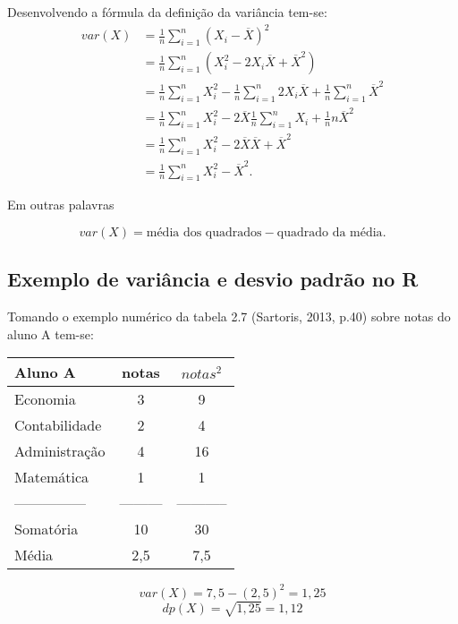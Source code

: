 \documentclass[
]{book}
\begin{document}
Desenvolvendo a fórmula da definição da variância tem-se:
\begin{align*}
  var(X)  &= \frac{1}{n}\sum_{i=1}^{n}(X_i - \overline{X})^2 \\
          &= \frac{1}{n}\sum_{i=1}^{n}(X_i^2 - 2X_i\overline{X} +
          \overline{X}^2)\\
          &= \frac{1}{n}\sum_{i=1}^{n}X_i^2 - 
          \frac{1}{n}\sum_{i=1}^{n}2X_i\overline{X}+
          \frac{1}{n}\sum_{i=1}^{n}\overline{X}^2\\
          &= \frac{1}{n}\sum_{i=1}^{n}X_i^2 - 
          2\overline{X}\frac{1}{n}\sum_{i=1}^{n}X_i+
          \frac{1}{n}n\overline{X}^2\\
          &= \frac{1}{n}\sum_{i=1}^{n}X_i^2 - 
          2\overline{X}\overline{X}+ \overline{X}^2\\
          &= \frac{1}{n}\sum_{i=1}^{n}X_i^2 - \overline{X}^2.
\end{align*}

Em outras palavras

\begin{equation*}
  var(X) = \text{média dos quadrados} - \text{quadrado da média}.
\end{equation*}

\hypertarget{exemplo-de-variuxe2ncia-e-desvio-padruxe3o-no-r}{%
\subsection{Exemplo de variância e desvio padrão no R}\label{exemplo-de-variuxe2ncia-e-desvio-padruxe3o-no-r}}

Tomando o exemplo numérico da tabela 2.7 (Sartoris, 2013, p.40) sobre notas do
aluno A tem-se:

\begin{longtable}[]{@{}lcc@{}}
\toprule
Aluno A & notas & \(notas^2\)\tabularnewline
\midrule
\endhead
Economia & 3 & 9\tabularnewline
Contabilidade & 2 & 4\tabularnewline
Administração & 4 & 16\tabularnewline
Matemática & 1 & 1\tabularnewline
--------------- & --------- & -----------\tabularnewline
Somatória & 10 & 30\tabularnewline
Média & 2,5 & 7,5\tabularnewline
\bottomrule
\end{longtable}

\begin{equation*}
  var(X) = 7,5 - (2,5)^2 = 1,25
\end{equation*}
\begin{equation*}
  dp(X) = \sqrt{1,25} = 1,12
\end{equation*}
\end{document}
